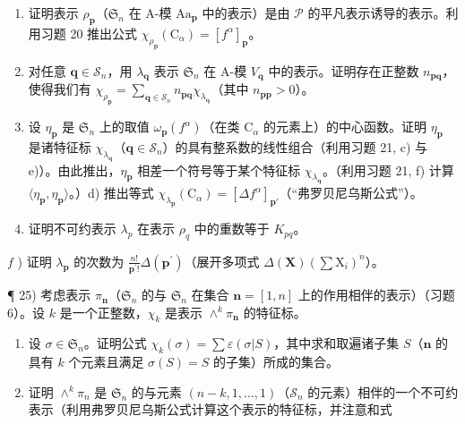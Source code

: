 \begin{enumerate}
\def\labelenumi{\alph{enumi})}
\item
  证明表示 \(\rho_{\mathbf{p}}\)（\(\mathfrak{S}_n\) 在 A-模 \(\mathrm{Aa}_{\mathbf{p}}\) 中的表示）是由 \(\mathcal{P}\) 的平凡表示诱导的表示。利用习题 20 推出公式 \(\chi_{\rho_{\mathbf{p}}}(\mathrm{C}_{\alpha}) = [f^{\alpha}]_{\mathbf{p}}\)。
\item
  对任意 \(\mathbf{q} \in \mathcal{S}_n\)，用 \(\lambda_{\mathbf{q}}\) 表示 \(\mathfrak{S}_n\) 在 A-模 \(V_{\mathbf{q}}\) 中的表示。证明存在正整数 \(n_{\mathbf{pq}}\)，使得我们有 \(\chi_{\rho_{\mathbf{p}}} = \sum_{\mathbf{q} \in \mathcal{S}_n} n_{\mathbf{pq}} \chi_{\lambda_{\mathbf{q}}}\)（其中 \(n_{\mathbf{pp}} > 0\)）。
\item
  设 \(\eta_{\mathbf{p}}\) 是 \(\mathfrak{S}_n\) 上的取值 \(\omega_{\mathbf{p}}(f^{\alpha})\)（在类 \(\mathrm{C}_{\alpha}\) 的元素上）的中心函数。证明 \(\eta_{\mathbf{p}}\) 是诸特征标 \(\chi_{\lambda_{\mathbf{q}}}\)（\(\mathbf{q} \in \mathcal{S}_n\)）的具有整系数的线性组合（利用习题 21, c) 与 e)）。由此推出，\(\eta_{\mathbf{p}}\) 相差一个符号等于某个特征标 \(\chi_{\lambda_{\mathbf{q}}}\)。（利用习题 21, f) 计算 \(\langle \eta_{\mathbf{p}}, \eta_{\mathbf{p}} \rangle\)。）d) 推出等式 \(\chi_{\lambda_{\mathbf{p}}}(\mathrm{C}_{\alpha}) = [\Delta f^{\alpha}]_{\mathbf{p}'}\)（“弗罗贝尼乌斯公式”）。
\item
  证明不可约表示 \(\lambda_{p}\) 在表示 \(\rho_{q}\) 中的重数等于 \(K_{pq}\)。
\end{enumerate}

\(f\) ) 证明 \(\lambda_{\mathbf{p}}\) 的次数为 \(\frac{n!}{\mathbf{p}^{\prime}!}\Delta (\mathbf{p}^{\prime})\)（展开多项式 \(\Delta (\mathbf{X})(\sum \mathrm{X}_i)^n\)）。

¶ 25) 考虑表示 \(\pi_{\mathbf{n}}\)（\(\mathfrak{S}_n\) 的与 \(\mathfrak{S}_n\) 在集合 \(\mathbf{n} = [1, n]\) 上的作用相伴的表示）（习题 6）。设 \(k\) 是一个正整数，\(\chi_k\) 是表示 \(\wedge^k \pi_{\mathbf{n}}\) 的特征标。

\begin{enumerate}
\def\labelenumi{\alph{enumi})}
\item
  设 \(\sigma \in \mathfrak{S}_n\)。证明公式 \(\chi_k(\sigma) = \sum \varepsilon (\sigma |S)\)，其中求和取遍诸子集 \(S\)（\(\mathbf{n}\) 的具有 \(k\) 个元素且满足 \(\sigma (S) = S\) 的子集）所成的集合。
\item
  证明 \(\wedge^{k}\pi_{n}\) 是 \(\mathfrak{S}_n\) 的与元素 \((n-k,1,\ldots,1)\)（\(\mathcal{S}_n\) 的元素）相伴的一个不可约表示（利用弗罗贝尼乌斯公式计算这个表示的特征标，并注意和式
\end{enumerate}

